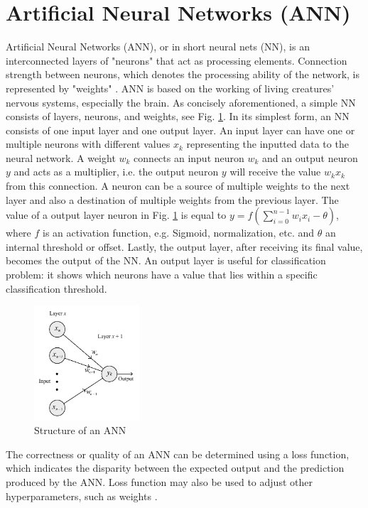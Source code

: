 \section{Artificial Neural Networks (ANN)}
\indent\indent Artificial Neural Networks (ANN), or in short neural nets (NN), is an interconnected layers of "neurons" that act as processing elements. Connection strength between neurons, which denotes the processing ability of the network, is represented by "weights" \cite{NN01}. ANN is based on the working of living creatures' nervous systems, especially the brain. As concisely aforementioned, a simple NN consists of layers, neurons, and weights, see Fig. \ref{fig:3ann}. In its simplest form, an NN consists of one input layer and one output layer. An input layer can have one or multiple neurons with different values $x_k$ representing the inputted data to the neural network. A weight $w_k$ connects an input neuron $w_k$ and an output neuron $y$ and acts as a multiplier, i.e. the output neuron $y$ will receive the value $w_k{}x_k$ from this connection. A neuron can be a source of multiple weights to the next layer and also a destination of multiple weights from the previous layer. The value of a output layer neuron in Fig. \ref{fig:3ann} is equal to $y = f(\sum^{n-1}_{i=0}w_i{}x_i-\theta)$, where $f$ is an activation function, e.g. Sigmoid, normalization, etc. and $\theta$ an internal threshold or offset. Lastly, the output layer, after receiving its final value, becomes the output of the NN. An output layer is useful for classification problem: it shows which neurons have a value that lies within a specific classification threshold.

\begin{figure}[h]
    \centering
    \includegraphics[width=0.35\textwidth]{graphics/3ann.pdf}
    \caption{Structure of an ANN \cite{NN01}}
    \label{fig:3ann}
\end{figure}

The correctness or quality of an ANN can be determined using a loss function, which indicates the disparity between the expected output and the prediction produced by the ANN. Loss function may also be used to adjust other hyperparameters, such as weights \cite{NN02}.

